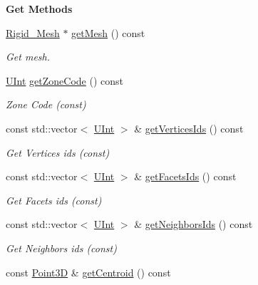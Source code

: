 \begin{Indent}{\bf Get Methods}\par
\begin{DoxyCompactItemize}
\item 
\hyperlink{classFVCode3D_1_1Rigid__Mesh}{Rigid\+\_\+\+Mesh} $\ast$ \hyperlink{classFVCode3D_1_1Rigid__Mesh_1_1Cell_ad7bee6050d6fc3a42493e84bf59c389f}{get\+Mesh} () const 
\begin{DoxyCompactList}\small\item\em Get mesh. \end{DoxyCompactList}\item 
\hyperlink{namespaceFVCode3D_a4bf7e328c75d0fd504050d040ebe9eda}{U\+Int} \hyperlink{classFVCode3D_1_1Rigid__Mesh_1_1Cell_a0a3b017d1297cca8e4a5d5708b82ce40}{get\+Zone\+Code} () const 
\begin{DoxyCompactList}\small\item\em Zone Code (const) \end{DoxyCompactList}\item 
const std\+::vector$<$ \hyperlink{namespaceFVCode3D_a4bf7e328c75d0fd504050d040ebe9eda}{U\+Int} $>$ \& \hyperlink{classFVCode3D_1_1Rigid__Mesh_1_1Cell_a30320991841567377cfbc1248c844d85}{get\+Vertices\+Ids} () const 
\begin{DoxyCompactList}\small\item\em Get Vertices ids (const) \end{DoxyCompactList}\item 
const std\+::vector$<$ \hyperlink{namespaceFVCode3D_a4bf7e328c75d0fd504050d040ebe9eda}{U\+Int} $>$ \& \hyperlink{classFVCode3D_1_1Rigid__Mesh_1_1Cell_adbfb39c41f1d6c6d96c77578eecbf766}{get\+Facets\+Ids} () const 
\begin{DoxyCompactList}\small\item\em Get Facets ids (const) \end{DoxyCompactList}\item 
const std\+::vector$<$ \hyperlink{namespaceFVCode3D_a4bf7e328c75d0fd504050d040ebe9eda}{U\+Int} $>$ \& \hyperlink{classFVCode3D_1_1Rigid__Mesh_1_1Cell_aee3bbfbbbb058448aeb3bb6d1a0dafda}{get\+Neighbors\+Ids} () const 
\begin{DoxyCompactList}\small\item\em Get Neighbors ids (const) \end{DoxyCompactList}\item 
const \hyperlink{classFVCode3D_1_1Point3D}{Point3D} \& \hyperlink{classFVCode3D_1_1Rigid__Mesh_1_1Cell_aede70ac8a525e2704476e9fd166420f3}{get\+Centroid} () const 

\end{DoxyCompactItemize}
\end{Indent}
